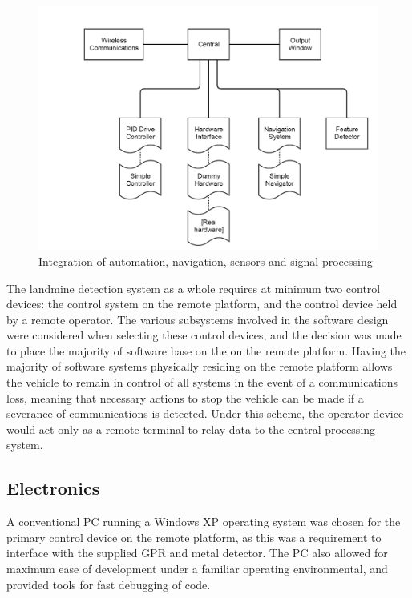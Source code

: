 \documentclass[main.tex]{subfiles}
\begin{document}
\begin{figure}[ht]
\includegraphics[width=\textwidth]{3-ConceptDesign/fyp_structure.png}
\centering
\caption{Integration of automation, navigation, sensors and signal processing} 
\end{figure}

The landmine detection system as a whole requires at minimum two control devices: the control system on the remote platform, and the control device held by a remote operator. The various subsystems involved in the software design were considered when selecting these control devices, and the decision was made to place the majority of software base on the on the remote platform. Having the majority of software systems physically residing on the remote platform allows the vehicle to remain in control of all systems in the event of a communications loss, meaning that necessary actions to stop the vehicle can be made if a severance of communications is detected. Under this scheme, the operator device would act only as a remote terminal to relay data to the central processing system.

\subsection{Electronics}
A conventional PC running a Windows XP operating system was chosen for the primary control device on the remote platform, as this was a requirement to interface with the supplied GPR and metal detector. The PC also allowed for maximum ease of development under a familiar operating environmental, and provided tools for fast debugging of code.
\end{document}
